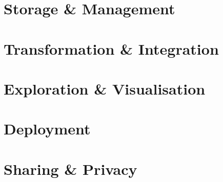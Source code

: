 \documentclass[11pt,a4paper]{article}
\begin{document}
\section{Storage \& Management}\label{sec_storage_and_management}

\section{Transformation \& Integration}\label{sec_transformation_and_integration}

\section{Exploration \& Visualisation}\label{sec_exploration_and_visualisation}

\section{Deployment}\label{sec_deployment}

\section{Sharing \& Privacy}\label{sec_sharing_and_privacy}
\end{document}
